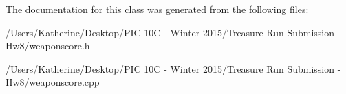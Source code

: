 The documentation for this class was generated from the following files\+:\begin{DoxyCompactItemize}
\item 
/\+Users/\+Katherine/\+Desktop/\+P\+I\+C 10\+C -\/ Winter 2015/\+Treasure Run Submission -\/ Hw8/weaponscore.\+h\item 
/\+Users/\+Katherine/\+Desktop/\+P\+I\+C 10\+C -\/ Winter 2015/\+Treasure Run Submission -\/ Hw8/weaponscore.\+cpp\end{DoxyCompactItemize}
